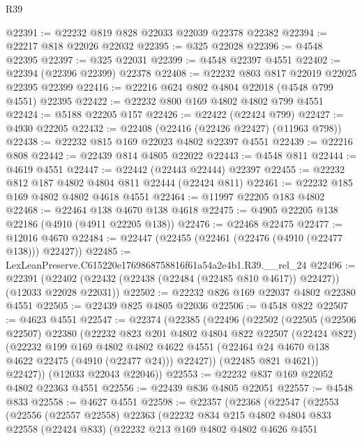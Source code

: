 \begin{lexlean}{R39}
\begin{coremodule}
@22391 := @22232 @819 @828 @22033 @22039 @22378 @22382
@22394 := @22217 @818 @22026 @22032
@22395 := @325 @22028
@22396 := @4548 @22395
@22397 := @325 @22031
@22399 := @4548 @22397 @4551
@22402 := @22394 (@22396 @22399) @22378
@22408 := @22232 @803 @817 @22019 @22025 @22395 @22399
@22416 := @22216 @624 @802 @4804 @22018 (@4548 @799 @4551) @22395
@22422 := @22232 @800 @169 @4802 @4802 @799 @4551
@22424 := @5188 @22205 @157
@22426 := @22422 (@22424 @799)
@22427 := @4930 @22205
@22432 := @22408 (@22416 (@22426 @22427) (@11963 @798))
@22438 := @22232 @815 @169 @22023 @4802 @22397 @4551
@22439 := @22216 @808
@22442 := @22439 @814 @4805 @22022
@22443 := @4548 @811
@22444 := @4619 @4551
@22447 := @22442 (@22443 @22444) @22397
@22455 := @22232 @812 @187 @4802 @4804 @811 @22444 (@22424 @811)
@22461 := @22232 @185 @169 @4802 @4802 @4618 @4551
@22464 := @11997 @22205 @183 @4802
@22468 := @22464 @138 @4670 @138 @4618
@22475 := @4905 @22205 @138 @22186 (@4910 (@4911 @22205 @138))
@22476 := @22468 @22475
@22477 := @12016 @4670
@22484 := @22447 (@22455 (@22461 (@22476 (@4910 (@22477 @138))) @22427))
@22485 := LexLeanPreserve.C615220e1769868758816f61a54a2e4b1.R39.__rel_24
@22496 := @22391
    (@22402 (@22432 (@22438 (@22484 (@22485 @810 @4617)) @22427)) (@12033 @22028 @22031))
@22502 := @22232 @826 @169 @22037 @4802 @22380 @4551
@22505 := @22439 @825 @4805 @22036
@22506 := @4548 @822
@22507 := @4623 @4551
@22547 := @22374
    (@22385
      (@22496
        (@22502
          (@22505
            (@22506 @22507)
            @22380
            (@22232
              @823
              @201
              @4802
              @4804
              @822
              @22507
              (@22424 @822)
              (@22232
                @199
                @169
                @4802
                @4802
                @4622
                @4551
                (@22464 @24 @4670 @138 @4622 @22475 (@4910 (@22477 @24)))
                @22427))
            (@22485 @821 @4621))
          @22427))
      (@12033 @22043 @22046))
@22553 := @22232 @837 @169 @22052 @4802 @22363 @4551
@22556 := @22439 @836 @4805 @22051
@22557 := @4548 @833
@22558 := @4627 @4551
@22598 := @22357
    (@22368
      (@22547
        (@22553
          (@22556
            (@22557 @22558)
            @22363
            (@22232
              @834
              @215
              @4802
              @4804
              @833
              @22558
              (@22424 @833)
              (@22232
                @213
                @169
                @4802
                @4802
                @4626
                @4551

\end{coremodule}
\end{lexlean}
